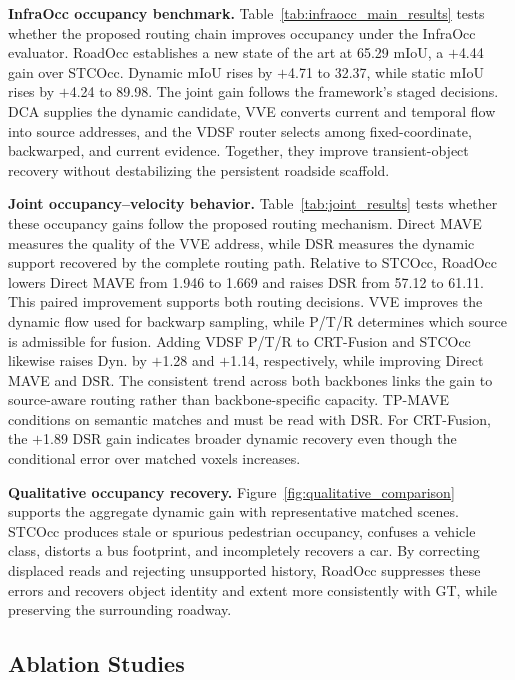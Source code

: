 \documentclass{article}
\begin{document}
\noindent\textbf{InfraOcc occupancy benchmark.}
Table~\ref{tab:infraocc_main_results} tests whether the proposed routing chain
improves occupancy under the InfraOcc evaluator. RoadOcc establishes a new state
of the art at 65.29 mIoU, a $+$4.44 gain over STCOcc. Dynamic mIoU rises by
$+$4.71 to 32.37, while static mIoU rises by $+$4.24 to 89.98. The joint gain
follows the framework's staged decisions. DCA supplies the dynamic candidate,
VVE converts current and temporal flow into source addresses, and the VDSF
router selects among fixed-coordinate, backwarped, and current evidence.
Together, they improve transient-object recovery without destabilizing the
persistent roadside scaffold.

\noindent\textbf{Joint occupancy--velocity behavior.}
Table~\ref{tab:joint_results} tests whether these occupancy gains follow the
proposed routing mechanism. Direct MAVE measures the quality of the VVE address,
while DSR measures the dynamic support recovered by the complete routing path.
Relative to STCOcc, RoadOcc lowers Direct MAVE from 1.946 to 1.669 and raises
DSR from 57.12 to 61.11. This paired improvement supports both routing
decisions. VVE
improves the dynamic flow used for backwarp sampling, while P/T/R determines
which source is admissible for fusion.
Adding VDSF P/T/R to CRT-Fusion and STCOcc likewise raises Dyn. by $+$1.28 and
$+$1.14, respectively, while improving Direct MAVE and DSR. The consistent
trend across both backbones links the gain to source-aware routing rather than
backbone-specific capacity. TP-MAVE conditions on semantic matches and must be
read with DSR. For CRT-Fusion, the $+$1.89 DSR gain indicates broader dynamic
recovery even though the conditional error over matched voxels increases.

\noindent\textbf{Qualitative occupancy recovery.}
Figure~\ref{fig:qualitative_comparison} supports the aggregate dynamic gain with
representative matched scenes. STCOcc produces
stale or spurious pedestrian occupancy, confuses a vehicle class, distorts a
bus footprint, and incompletely recovers a car. By correcting displaced reads
and rejecting unsupported history, RoadOcc suppresses these errors and recovers
object identity and extent more consistently with GT, while preserving the
surrounding roadway.

\subsection{Ablation Studies}
\label{sec:ablation}
\end{document}
